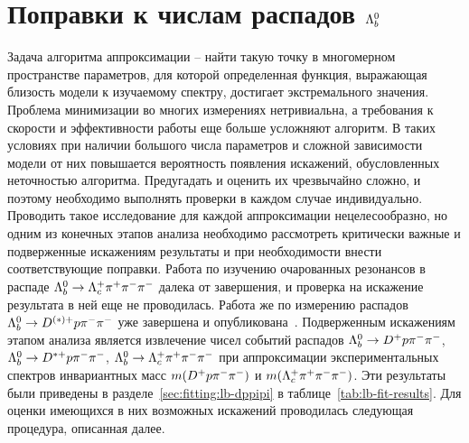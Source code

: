 \clearpage
\section{Поправки к числам распадов ${\Lambda_b^0}$}
\label{sec:corrections}

Задача алгоритма аппроксимации -- найти такую точку в многомерном 
пространстве параметров, для которой определенная функция, выражающая 
близость модели к изучаемому спектру, достигает экстремального значения. 
Проблема минимизации во многих измерениях нетривиальна, а требования 
к скорости и эффективности работы еще больше усложняют алгоритм. В таких 
условиях при наличии большого числа параметров и сложной зависимости 
модели от них повышается вероятность появления искажений, обусловленных 
неточностью алгоритма. Предугадать и оценить их чрезвычайно сложно, 
и поэтому необходимо выполнять проверки в каждом случае индивидуально. 
Проводить такое исследование для каждой аппроксимации нецелесообразно, 
но одним из конечных этапов анализа необходимо рассмотреть критически 
важные и подверженные искажениям результаты и при необходимости внести 
соответствующие поправки.
%
Работа по изучению очарованных резонансов в распаде 
$\Lb\to\Lc\pip\pim\pim$ далека от завершения, и проверка на искажение 
результата в ней еще не проводилась. Работа же по измерению распадов 
$\Lb\to\Doptstarp\p\pim\pim$ уже завершена 
и опубликована~\cite{lb2dppipi-paper}. Подверженным искажениям этапом 
анализа является извлечение чисел событий распадов 
$\Lb\to\Dp\p\pim\pim$, $\Lb\to\Dstarp\p\pim\pim$, 
$\Lb\to\Lc\pip\pim\pim$ при аппроксимации экспериментальных спектров 
инвариантных масс $m({D^+}{p}{\pi^-}{\pi^-})$ и $m({\Lambda_c^+}{\pi^+}{\pi^-}{\pi^-})$. Эти 
результаты были приведены в разделе~\ref{sec:fitting:lb-dppipi} 
в таблице~\ref{tab:lb-fit-results}. Для оценки имеющихся в них возможных 
искажений проводилась следующая процедура, описанная далее.

